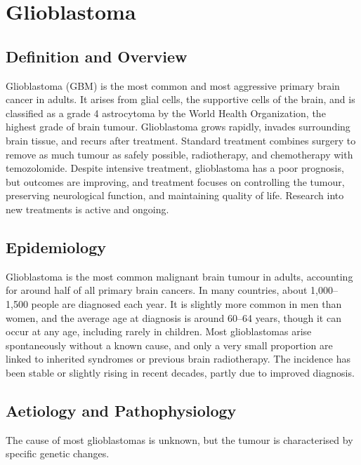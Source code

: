 \chapter{Glioblastoma}

\section*{Definition and Overview}
Glioblastoma (GBM) is the most common and most aggressive primary brain cancer in adults. It arises from glial cells, the supportive cells of the brain, and is classified as a grade 4 astrocytoma by the World Health Organization, the highest grade of brain tumour. Glioblastoma grows rapidly, invades surrounding brain tissue, and recurs after treatment. Standard treatment combines surgery to remove as much tumour as safely possible, radiotherapy, and chemotherapy with temozolomide. Despite intensive treatment, glioblastoma has a poor prognosis, but outcomes are improving, and treatment focuses on controlling the tumour, preserving neurological function, and maintaining quality of life. Research into new treatments is active and ongoing.

\section*{Epidemiology}
Glioblastoma is the most common malignant brain tumour in adults, accounting for around half of all primary brain cancers. In many countries, about 1,000--1,500 people are diagnosed each year. It is slightly more common in men than women, and the average age at diagnosis is around 60--64 years, though it can occur at any age, including rarely in children. Most glioblastomas arise spontaneously without a known cause, and only a very small proportion are linked to inherited syndromes or previous brain radiotherapy. The incidence has been stable or slightly rising in recent decades, partly due to improved diagnosis.

\section*{Aetiology and Pathophysiology}
The cause of most glioblastomas is unknown, but the tumour is characterised by specific genetic changes.

